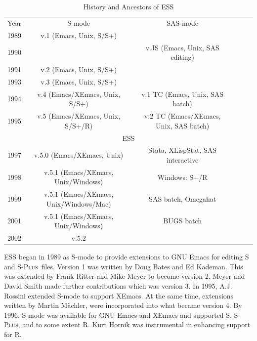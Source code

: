 \documentclass{article}
\newif\ifdraft
\newcommand*{\Splus}{\textsc{S-Plus}}
\newcommand{\stexttt}[1]{{\small\texttt{#1}}}
\newcommand{\emptyfig}{
\hspace*{42pt}\rule{324pt}{.25pt}\\
\hspace*{42pt}\rule{.25pt}{10pc}
\rule{316pt}{.25pt}
\rule{.25pt}{10pc}}
\begin{document}

\begin{table}[tbp]
  \centering
  \begin{tabular}{cccccc}
    Year & S-mode & SAS-mode \\ 
    1989 & v.1 (Emacs, Unix, S/S+) &  \\
    1990 &                         & v.JS (Emacs, Unix, SAS editing) \\
    1991 & v.2 (Emacs, Unix, S/S+) & \\
    1993 & v.3 (Emacs, Unix, S/S+) & \\
    1994 & v.4 (Emacs/XEmacs, Unix, S/S+)   & v.1 TC (Emacs, Unix, SAS batch) \\
    1995 & v.5 (Emacs/XEmacs, Unix, S/S+/R) & v.2 TC (Emacs/XEmacs, Unix, SAS batch) \\
    \hline & \multicolumn{2}{c}{ESS} \\ \hline 
    1997 & v.5.0 (Emacs/XEmacs, Unix)         &  Stata, XLispStat, SAS interactive \\
    1998 & v.5.1 (Emacs/XEmacs, Unix/Windows) &  Windows:  S+/R\\
    1999 & v.5.1 (Emacs/XEmacs, Unix/Windows/Mac) & SAS batch, Omegahat \\
    2001 & v.5.1 (Emacs/XEmacs, Unix/Windows)     & BUGS batch \\
    2002 & v.5.2 & \\
  \end{tabular}
  \caption{History and Ancestors of ESS}
  \label{tab:timeline}
\end{table}

ESS began in 1989 as S-mode to provide extensions to GNU Emacs for
editing S and \Splus\ files.  Version 1 was written by Doug Bates and
Ed Kademan.  This was extended by Frank Ritter and Mike Meyer to
become version 2.  Meyer and David Smith made further contributions
which was version 3.
In 1995, A.J. Rossini extended S-mode to support XEmacs.  At the same
time, extensions written by Martin M{\"a}chler, were incorporated into
what became version 4.  By 1996, S-mode was available for GNU Emacs
and XEmacs and supported S, \Splus, and to some extent R.  Kurt Hornik
was instrumental in enhancing support for R.
\end{document}
